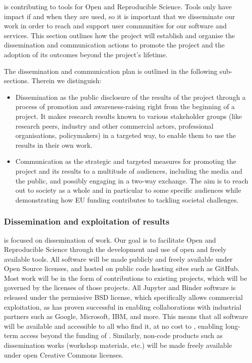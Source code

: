 \TheProject is contributing to tools for Open and Reproducible Science.
Tools only have impact if and when they are used,
so it is important that we disseminate our work
in order to reach and support user communities for our software and services. This section
outlines how the project will establish and organise the dissemination and communication
actions to promote the project and the adoption of its outcomes beyond the project's lifetime.

The dissemination and communication plan is outlined in the following sub-sections.
Therein we distinguish:
\begin{itemize}
\item Dissemination as the public disclosure of the results of the project through
a process of promotion and awareness-raising right from the beginning of a project.
It makes research results known to various stakeholder groups (like research peers, industry
and other commercial actors, professional organisations, policymakers) in a targeted
way, to enable them to use the results in their own work.
\item Communication as the strategic and targeted measures for promoting the project
and its results to a multitude of audiences, including the media and the public, and possibly
engaging in a two-way exchange. The aim is to reach out to society as a whole and
in particular to some specific audiences while demonstrating how EU funding contributes to tackling
societal challenges.
\end{itemize}

\subsubsection{Dissemination and exploitation of results}

 is focused on dissemination of \TheProject work.
Our goal is to facilitate Open and Reproducible Science through the development and use of open and freely available tools.
All \TheProject software will be made publicly and freely available under Open Source licenses, and
hosted on public code hosting sites such as GitHub.
Most \TheProject work will be in the form of
contributions to existing projects,
which will be governed by the licenses of those projects.
All Jupyter and Binder software is released under the permissive BSD license,
which specifically allows commercial exploitation,
as has proven successful in enabling collaborations with industrial partners
such as Google, Microsoft, IBM, and more.
This means that all \TheProject software will be available and accessible to all who find it,
at no cost to \TheProject,
enabling long-term access beyond the funding of \TheProject.
Similarly, non-code products such as dissemination works
(workshop materials, etc.)
will be made freely available under open Creative Commons licenses.

